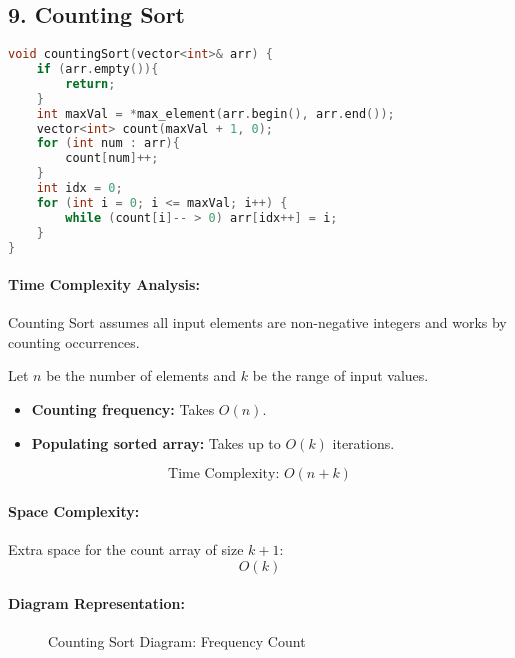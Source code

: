 \subsection*{\textbf{9. Counting Sort}}
\begin{lstlisting}[language=C++, caption=Counting Sort (Non-negative Integers)]
void countingSort(vector<int>& arr) {
    if (arr.empty()){
        return;
    }
    int maxVal = *max_element(arr.begin(), arr.end());
    vector<int> count(maxVal + 1, 0);
    for (int num : arr){
        count[num]++;
    }
    int idx = 0;
    for (int i = 0; i <= maxVal; i++) {
        while (count[i]-- > 0) arr[idx++] = i;
    }
}
\end{lstlisting}

\paragraph{Time Complexity Analysis:}
Counting Sort assumes all input elements are non-negative integers and works by counting occurrences.

Let \( n \) be the number of elements and \( k \) be the range of input values.

\begin{itemize}
  \item \textbf{Counting frequency:} Takes \( O(n) \).
  \item \textbf{Populating sorted array:} Takes up to \( O(k) \) iterations.
\end{itemize}

\[
\boxed{\text{Time Complexity: } O(n + k)}
\]

\paragraph{Space Complexity:}
Extra space for the count array of size \( k + 1 \):
\[
\boxed{O(k)}
\]

\paragraph{Diagram Representation:}

\begin{figure}[H]
\centering
{}
\caption{Counting Sort Diagram: Frequency Count}
\end{figure}


